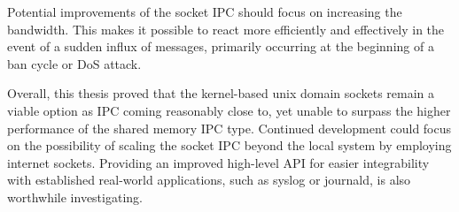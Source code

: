 Potential improvements of the socket \ac{IPC} should focus on increasing the bandwidth.
This makes it possible to react more efficiently and effectively in the event of a sudden influx of messages, primarily occurring at the beginning of a ban cycle or \ac{DoS} attack.

Overall, this thesis proved that the kernel-based unix domain sockets remain a viable option as \ac{IPC} coming reasonably close to, yet unable to surpass the higher performance of the shared memory \ac{IPC} type.
Continued development could focus on the possibility of scaling the socket \ac{IPC} beyond the local system by employing internet sockets.
Providing an improved high-level \ac{API} for easier integrability with established real-world applications, such as syslog or journald, is also worthwhile investigating.